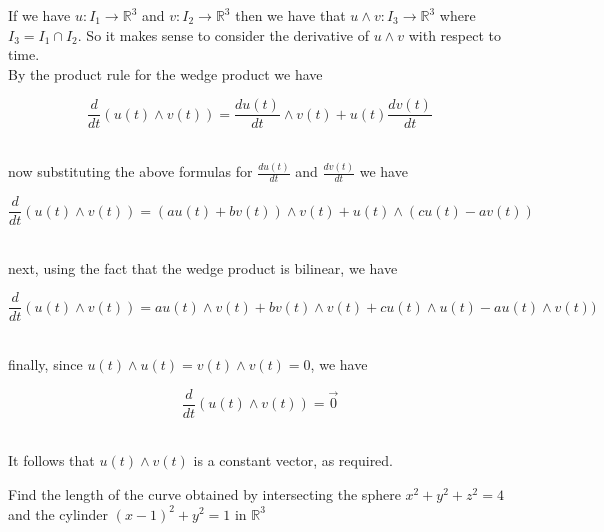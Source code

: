 \documentclass[12pt,letterpaper]{hmcpset}
\begin{document}
\begin{solution}
If we have $u: I_1 \to \mathbb{R}^3$ and $v: I_2 \to \mathbb{R}^3$ then we have that $u\wedge v: I_3 \to \mathbb{R}^3 $ where $I_3 = I_1 \cap I_2$.  So it makes sense to consider the derivative of $u\wedge v$ with respect to time.\\

By the product rule for the wedge product we have

\[ \frac{d}{dt}( u(t)\wedge v(t)) = \frac{du(t)}{dt} \wedge v(t) + u(t)\frac{dv(t)}{dt}\]\

now substituting the above formulas for $ \frac{du(t)}{dt}$ and $\frac{dv(t)}{dt}$ we have

\[ \frac{d}{dt}( u(t)\wedge v(t))  = (au(t) + bv(t))\wedge v(t) + u(t) \wedge (cu(t) - a v(t))\]\

next, using the fact that the wedge product is bilinear, we have

\[\frac{d}{dt}( u(t)\wedge v(t))  = au(t)\wedge v(t)  + bv(t)\wedge v(t) + c u(t) \wedge u(t) - au(t) \wedge v(t))\]\

finally, since $u(t)\wedge u(t) = v(t)\wedge v(t) =0$, we have

\[\frac{d}{dt}( u(t)\wedge v(t)) = \vec0\]\

It follows that  $u(t) \wedge v(t)$ is a constant vector, as required.




\end{solution}

\newpage

\begin{problem}
Find the length of the curve obtained by intersecting the sphere $x^2+y^2+z^2 =4$ and the cylinder $(x-1)^2 + y^2 =1$ in 
$\mathbb{R}^3$
\end{problem}
\end{document}
